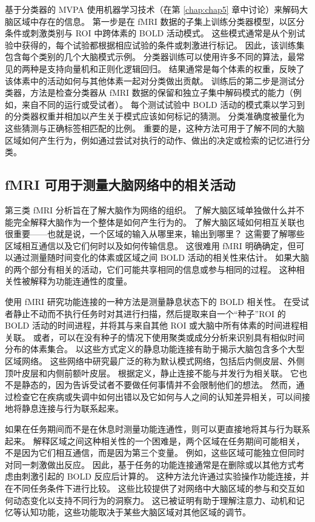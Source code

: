 基于分类器的 MVPA 使用机器学习技术（在第 \ref{chap:chap5} 章中讨论）来解码大脑区域中存在的信息。 
第一步是在 fMRI 数据的子集上训练分类器模型，以区分条件或刺激类别与 ROI 中跨体素的 BOLD 活动模式。
这些模式通常是从个别试验中获得的，每个试验都根据相应试验的条件或刺激进行标记。 
因此，该训练集包含每个类别的几个大脑模式示例。 
分类器训练可以使用许多不同的算法，最常见的两种是支持向量机和正则化逻辑回归。
结果通常是每个体素的权重，反映了该体素中的活动如何与其他体素一起对分类做出贡献。
训练后的第二步是测试分类器，方法是检查分类器从 fMRI 数据的保留和独立子集中解码模式的能力（例如，来自不同的运行或受试者）。
每个测试试验中 BOLD 活动的模式乘以学习到的分类器权重并相加以产生关于模式应该如何标记的猜测。
分类准确度被量化为这些猜测与正确标签相匹配的比例。
重要的是，这种方法可用于了解不同的大脑区域如何产生行为，例如通过尝试对执行的动作、做出的决定或检索的记忆进行分类。



\subsection{fMRI 可用于测量大脑网络中的相关活动}

第三类 fMRI 分析旨在了解大脑作为网络的组织。 
了解大脑区域单独做什么并不能完全解释大脑作为一个整体是如何产生行为的。 
了解大脑区域如何相互关联也很重要——也就是说，一个区域的输入从哪里来，输出到哪里？ 
这需要了解哪些区域相互通信以及它们何时以及如何传输信息。
这很难用 fMRI 明确确定，但可以通过测量随时间变化的体素或区域之间 BOLD 活动的相关性来估计。
如果大脑的两个部分有相关的活动，它们可能共享相同的信息或参与相同的过程。 
这种相关性被解释为功能连通性的度量。


使用 fMRI 研究功能连接的一种方法是测量静息状态下的 BOLD 相关性。 
在受试者静止不动而不执行任务时对其进行扫描，然后提取来自一个“种子”ROI 的 BOLD 活动的时间进程，并将其与来自其他 ROI 或大脑中所有体素的时间进程相关联。 
或者，可以在没有种子的情况下使用聚类或成分分析来识别具有相似时间分布的体素集合。 
以这些方式定义的静息功能连接有助于揭示大脑包含多个大型区域网络。 
这些网络中研究最广泛的称为默认模式网络，包括后内侧皮层、外侧顶叶皮层和内侧前额叶皮层。 
根据定义，静止连接不能与并发行为相关联。 
它也不是静态的，因为告诉受试者不要做任何事情并不会限制他们的想法。 
然而，通过检查它在疾病或失调中如何出错以及它如何与人之间的认知差异相关，可以间接地将静息连接与行为联系起来。


如果在任务期间而不是在休息时测量功能连通性，则可以更直接地将其与行为联系起来。 
解释区域之间这种相关性的一个困难是，两个区域在任务期间可能相关，不是因为它们相互通信，而是因为第三个变量。 
例如，这些区域可能独立但同时对同一刺激做出反应。 
因此，基于任务的功能连接通常是在删除或以其他方式考虑由刺激引起的 BOLD 反应后计算的。 
这种方法允许通过实验操作功能连接，并在不同任务条件下进行比较。
这些比较提供了对网络中大脑区域的参与和交互如何动态变化以支持不同行为的洞察力。 
这已被证明有助于理解注意力、动机和记忆等认知功能，这些功能取决于某些大脑区域对其他区域的调节。


